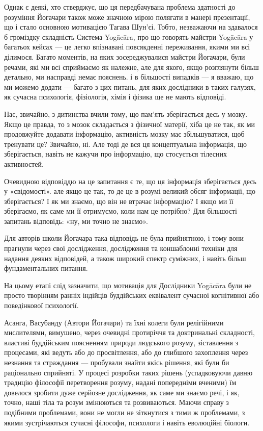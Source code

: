 Однак є деякі, хто стверджує, що ця передбачувана проблема здатності
до розуміння Йогачари також може значною мірою полягати в манері презентації,
що і стало основною мотивацією Тагава Шун'єі. Тобто, незважаючи на
здавалося б громіздку складність Система Yogācāra, про що говорять
майстри Yogācāra у багатьох кейсах --- це легко впізнавані повсякденні
переживання, якими ми всі ділимося. Багато моментів, на яких
зосереджувалися майстри Йогачари, були речами, які ми всі сприймаємо
як належне, але для якого, якщо розглянути більш детально, ми
насправді немає пояснень. і в більшості випадків --- я вважаю,
що ми можемо додати --- багато з цих питань, для яких дослідники
в таких галузях, як сучасна психологія, фізіологія, хімія і фізика
ще не мають відповіді.

Нас, звичайно, з дитинства вчили тому, що пам'ять зберігається десь
у мозку. Якщо це правда, то з мозок складається з фізичної матерії,
хіба це не так, як ми продовжуйте додавати інформацію, активність
мозку має збільшуватися, щоб тренувати це? Звичайно, ні. Але тоді
де вся ця концептуальна інформація, що зберігається, навіть не кажучи
про інформацію, що стосується тілесних активностей.

Очевидною відповіддю на це запитання є те, що ця інформація
зберігається десь у «свідомості». але якщо це так, то де це в
розумі великий обсяг інформації, що зберігається? І як ми знаємо,
що він не втрачає інформацію? І якщо ми її зберігаємо,
як саме ми її отримуємо, коли нам це потрібно? Для більшості
запитань відповідь: «ну, ми точно не знаємо».

Для авторів школи Йогачара така відповідь не була прийнятною, і
тому вони прагнули через свої дослідження, дослідження та коншаблонні
техніки для надання деяких відповідей, а також широкий спектр суміжних,
і навіть більш фундаментальних питання.

На цьому етапі слід зазначити, що мотивація для Дослідники Yogācāra
були не просто творінням ранніх індійців буддійських еквівалент
сучасної когнітивної або поведінкової психології.

Асанга, Васубанду (Автори Йогачари) та їхні колеги були релігійними
мислителями, вимушено, через очевидні протиріччя та доктринальні
складності, властиві буддійським поясненням природи людського розуму,
зіставлення з процесами, які ведуть або до просвітлення, або до
глибшого захоплення через незнання та страждання --- пробували
знайти якісь рішення, які були би раціонально сприйняті. У процесі
розробки таких рішень (успадковуючи давню традицію філософії
перетворення розуму, надані попередніми вченими) їм довелося
зробити дуже серйозне дослідження, як саме ми знаємо речі, і як,
точно, наші тіла та розум змінюються та розвиваються. Маючи справу
з подібними проблемами, вони не могли не зіткнутися з тими ж проблемами,
з якими зустрічаються сучасні філософи, психологи і навіть еволюційні біологи.

